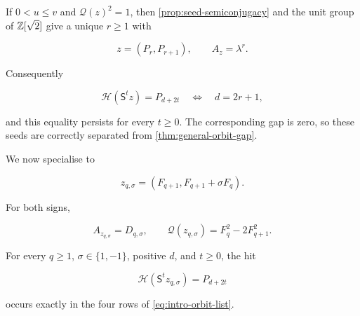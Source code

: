 \begin{remark}
\label{rem:canonical-seeds}
If $0<u\leqslant v$ and $\mathcal Q(z)^2=1$, then
\cref{prop:seed-semiconjugacy} and the unit group of $\mathbb{Z}[\sqrt2]$ give a
unique $r\geqslant1$ with

\begin{equation}
 z=(P_r,P_{r+1}),
 \qquad
 A_z=\lambda^r.
\end{equation}

Consequently

\begin{equation}
 \mathcal H(\mathsf S^tz)=P_{d+2t}
 \quad\Longleftrightarrow\quad
 d=2r+1,
\end{equation}

and this equality persists for every $t\geqslant0$. The corresponding gap
is zero, so these seeds are correctly separated from
\cref{thm:general-orbit-gap}.
\end{remark}

We now specialise to

\begin{equation}
 z_{q,\sigma}=(F_{q+1},F_{q+1}+\sigma F_q).
 \label{eq:fibonacci-cores}
\end{equation}

For both signs,

\begin{equation}
 A_{z_{q,\sigma}}=D_{q,\sigma},
 \qquad
 \mathcal Q(z_{q,\sigma})=F_q^2-2F_{q+1}^2.
 \label{eq:fibonacci-core-map}
\end{equation}

\begin{theorem}
\label{thm:complete-fibonacci-orbits}
For every $q\geqslant1$, $\sigma\in\{1,-1\}$, positive $d$, and
$t\geqslant0$, the hit

\begin{equation}
 \mathcal H(\mathsf S^tz_{q,\sigma})=P_{d+2t}
 \label{eq:fibonacci-orbit-hit}
\end{equation}

occurs exactly in the four rows of \cref{eq:intro-orbit-list}.
\end{theorem}

